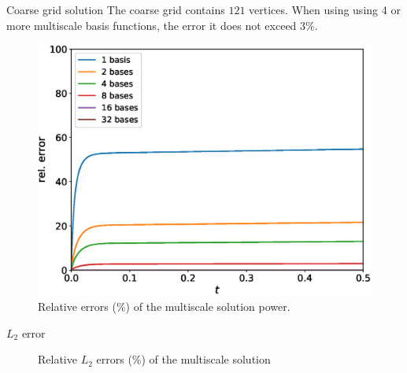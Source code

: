\documentclass[10pt,pdf,hyperref={unicode}]{beamer}
\begin{document}
	\begin{frame}{Coarse grid solution}
		The coarse grid contains $121$ vertices.
		When using using 4 or more multiscale basis functions, the error it does not exceed 3\%.
		\begin{figure}[h]
			\centering
			\includegraphics[width=0.5\linewidth]{twigl/power_error.eps} 
			\caption{Relative errors ($\%$) of the multiscale solution power.}
		\end{figure}
	\end{frame}

	\begin{frame}{$L_2$ error}
		\begin{figure}[h]
			\centering
			\quad
			\quad
			\caption{Relative $L_2$ errors ($\%$) of the multiscale solution}
		\end{figure}
	\end{frame}
\end{document}
